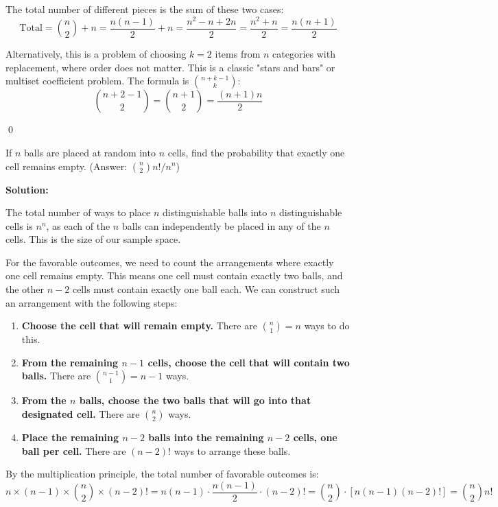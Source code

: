 The total number of different pieces is the sum of these two cases:
\[ \text{Total} = \binom{n}{2} + n = \frac{n(n-1)}{2} + n = \frac{n^2 - n + 2n}{2} = \frac{n^2+n}{2} = \frac{n(n+1)}{2} \]

Alternatively, this is a problem of choosing $k=2$ items from $n$ categories with replacement, where order does not matter. This is a classic "stars and bars" or multiset coefficient problem. The formula is $\binom{n+k-1}{k}$:
\[ \binom{n+2-1}{2} = \binom{n+1}{2} = \frac{(n+1)n}{2} \]



\qed
\begin{problembox}
If $n$ balls are placed at random into $n$ cells, find the probability that exactly one cell remains empty.
(Answer: $\binom{n}{2}n!/n^{n}$)
\end{problembox}

\noindent\textbf{Solution:}

The total number of ways to place $n$ distinguishable balls into $n$ distinguishable cells is $n^n$, as each of the $n$ balls can independently be placed in any of the $n$ cells. This is the size of our sample space.

For the favorable outcomes, we need to count the arrangements where exactly one cell remains empty. This means one cell must contain exactly two balls, and the other $n-2$ cells must contain exactly one ball each. We can construct such an arrangement with the following steps:

\begin{enumerate}
    \item \textbf{Choose the cell that will remain empty.} There are $\binom{n}{1} = n$ ways to do this.
    \item \textbf{From the remaining $n-1$ cells, choose the cell that will contain two balls.} There are $\binom{n-1}{1} = n-1$ ways.
    \item \textbf{From the $n$ balls, choose the two balls that will go into that designated cell.} There are $\binom{n}{2}$ ways.
    \item \textbf{Place the remaining $n-2$ balls into the remaining $n-2$ cells, one ball per cell.} There are $(n-2)!$ ways to arrange these balls.
\end{enumerate}

By the multiplication principle, the total number of favorable outcomes is:
\[ n \times (n-1) \times \binom{n}{2} \times (n-2)! = n(n-1) \cdot \frac{n(n-1)}{2} \cdot (n-2)! = \binom{n}{2} \cdot [n(n-1)(n-2)!] = \binom{n}{2} n! \]

